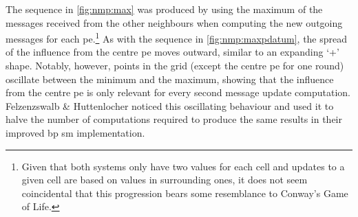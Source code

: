 The sequence in \autoref{fig:nmp:max} was produced by using the maximum of the messages received from the other neighbours when computing the new outgoing messages for each \gls{pe}.\footnote{Given that both systems only have two values for each cell and updates to a given cell are based on values in surrounding ones, it does not seem coincidental that this progression bears some resemblance to Conway's Game of Life.}  As with the sequence in \autoref{fig:nmp:maxpdatum}, the spread of the influence from the centre \gls{pe} moves outward, similar to an expanding `+' shape.  Notably, however, points in the grid (except the centre \gls{pe} for one round) oscillate between the minimum and the maximum, showing that the influence from the centre \gls{pe} is only relevant for every second message update computation.  Felzenzswalb \& Huttenlocher \cite{Felzenszwalb2006} noticed this oscillating behaviour and used it to halve the number of computations required to produce the same results in their improved \gls{bp} \gls{sm} implementation.

